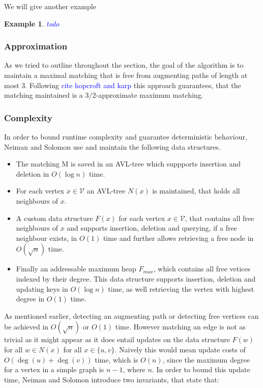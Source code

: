 \documentclass{article}      %
\newcommand\todo[1]{\textcolor{blue}{#1}}
\newtheorem{example}{Example}[subsection]
\begin{document}
We will give another example 

\begin{example}
\todo{todo}
\end{example}

\subsubsection{Approximation}
\label{sec:ns-approx}

As we tried to outline throughout the section, the goal of the algorithm is to maintain a maximal matching that is free from augmenting paths of length at most 3. Following \todo{cite hopcroft and karp} this approach guarantees, that the matching maintained is a $3/2$-approximate maximum matching.

\subsubsection{Complexity}
\label{sec:ns-complx}

In order to bound runtime complexity and guarantee deterministic behaviour, Neiman and Solomon use and maintain the following data structures. 

\begin{itemize}
\item The matching M is saved in an AVL-tree which suppports insertion and deletion in $O(\log n)$ time.
\item For each vertex $x \in \mathcal{V}$ an AVL-tree $N(x)$ is maintained, that holds all neighbours of $x$.
\item A custom data structure $F(x)$ for each vertex $x \in \mathcal{V}$, that contains all free neighbours of $x$ and supports insertion, deletion and querying, if a free neighbour exists, in $O(1)$ time and further allows retrieving a free node in $O(\sqrt{n})$ time.
\item Finally an addressable maximum heap $F_{max}$, which contains all free vetices indexed by their degree. This data structure supports insertion, deletion and updating keys in $O(\log n)$ time, as well retrieving the vertex with highest degree in $O(1)$ time.
\end{itemize}

\noindent
As mentioned earlier, detecting an augmenting path or detecting free vertices can be achieved in $O(\sqrt{n})$ or $O(1)$ time. However matching an edge is not as trivial as it might appear as it does entail updates on the data structure $F(w)$ for all $w \in N(x)$ for all $x \in \{u,v\}$. Naively this would mean update costs of $O(\deg(u) + \deg(v))$ time, which is $O(n)$, since the maximum degree for a vertex in a simple graph is $n-1$, where $n$. In order to bound this update time, Neiman and Solomon introduce two invariants, that state that:
\end{document}
